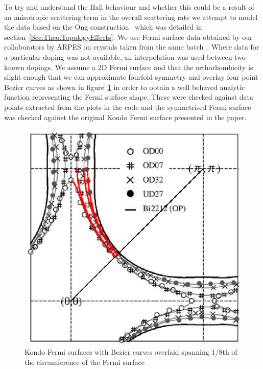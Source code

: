 To try and understand the Hall behaviour and whether this could be a result of an anisotropic scattering term in the overall scattering rate we attempt to model the data based on the Ong construction~\cite{Ong1991} which was detailed in section~\ref{Sec:Theo:TopologyEffects}. We use Fermi surface data obtained by our collaborators by \ac{ARPES} on crystals taken from the same batch~\cite{Kondo2004}. Where data for a particular doping was not available, an interpolation was used between two known dopings. We assume a 2D Fermi surface and that the orthorhombicity is slight enough that we can approximate fourfold symmetry and overlay four point Bezier curves as shown in figure~\ref{Fig:ResH:KondoFS} in order to obtain a well behaved analytic function representing the Fermi surface shape. These were checked against data points extracted from the plots in the code and the symmetrised Fermi surface was checked against the original Kondo Fermi surface presented in the paper.
\begin{figure}[htbp]
    \begin{center}
        \includegraphics[scale=0.9]{Chapter-HallBSCO/Figures/KondoFS/KondoFS}
        \caption{Kondo Fermi surfaces with Bezier curves overlaid spanning 1/8th of the circumference of the Fermi surface}
        \label{Fig:ResH:KondoFS}
    \end{center}
\end{figure}

